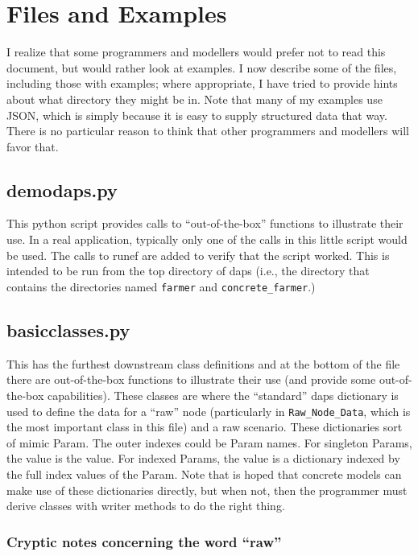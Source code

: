 \documentclass[12pt]{article}
\begin{document}
\newpage
\section{Files and Examples}

I realize that some programmers and modellers would prefer not to read
this document, but would rather look at examples. I now describe some
of the files, including those with examples; where appropriate, I have
tried to provide hints about what directory they might be in. Note
that many of my examples use JSON, which is simply because it is easy
to supply structured data that way. There is no particular reason to
think that other programmers and modellers will favor that.

\subsection{demodaps.py}

This python script provides calls to ``out-of-the-box'' functions to
illustrate their use. In a real application, typically only one of the
calls in this little script would be used. The calls to
runef are added to verify that the script worked. This is intended to be
run from the top directory of daps (i.e., the directory that
contains the directories named \verb|farmer| and
\verb|concrete_farmer|.)

\subsection{basicclasses.py}

This has the furthest downstream class definitions and at the bottom
of the file there are out-of-the-box functions to illustrate their use
(and provide some out-of-the-box capabilities). These classes are
where the ``standard'' daps dictionary is used to define the data for a
``raw'' node (particularly in \verb|Raw_Node_Data|, which is the most
important class in this file) and a raw scenario. These dictionaries sort of mimic
Param. The outer indexes could be Param names. For singleton Params,
the value is the value. For indexed Params, the value is a dictionary
indexed by the full index values of the Param. Note that is hoped that
concrete models can make use of these dictionaries directly, but when
not, then the programmer must derive classes with writer methods to do
the right thing.

\subsubsection*{Cryptic notes concerning the word ``raw''}
\end{document}
